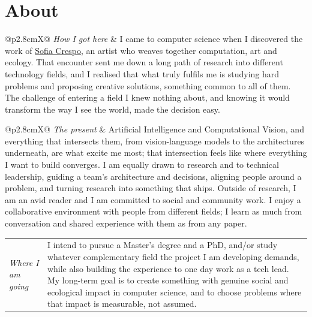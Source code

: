 \documentclass[10pt, a4paper]{article}
\begin{document}
\section{About}
\begin{tabularx}{\linewidth}{@{}p{2.8cm}X@{}}
    {\small\color{muted}\textit{How I got here}} &
    \small I came to computer science when I discovered the work of \href{https://en.wikipedia.org/wiki/Sofia_Crespo}{Sofia Crespo},
    an artist who weaves together computation, art and ecology. That encounter sent me
    down a long path of research into different technology fields, and I realised that
    what truly fulfils me is studying hard problems and proposing creative solutions,
    something common to all of them. The challenge of entering a field I knew nothing
    about, and knowing it would transform the way I see the world, made the decision easy.
\end{tabularx}
\vspace{0.12em}
\begin{tabularx}{\linewidth}{@{}p{2.8cm}X@{}}
    {\small\color{muted}\textit{The present}} &
    \small Artificial Intelligence and Computational Vision, and everything that
    intersects them, from vision-language models to the architectures underneath,
    are what excite me most; that intersection feels like where everything I want
    to build converges. I am equally drawn to research and to technical leadership,
    guiding a team's architecture and decisions, aligning people around a problem,
    and turning research into something that ships. Outside of research, I am an avid reader and I am committed to social and community work. I enjoy a collaborative environment with
    people from different fields; I learn as much from conversation and shared
    experience with them as from any paper.
\end{tabularx}
\vspace{0.12em}
\begin{tabularx}{\linewidth}{@{}p{2.8cm}X@{}}
    {\small\color{muted}\textit{Where I am going}} &
    \small I intend to pursue a Master's degree and a PhD, and/or study whatever
    complementary field the project I am developing demands, while also building the
    experience to one day work as a tech lead. My long-term goal is to create
    something with genuine social and ecological impact in computer science, and to
    choose problems where that impact is measurable, not assumed. 
\end{tabularx}

\end{document}
